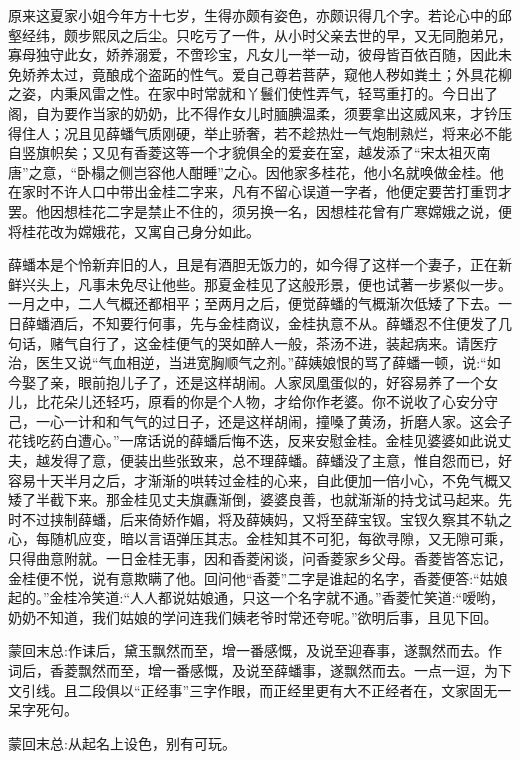 \begin{parag}
    原来这夏家小姐今年方十七岁，生得亦颇有姿色，亦颇识得几个字。若论心中的邱壑经纬，颇步熙凤之后尘。只吃亏了一件，从小时父亲去世的早，又无同胞弟兄，寡母独守此女，娇养溺爱，不啻珍宝，凡女儿一举一动，彼母皆百依百随，因此未免娇养太过，竟酿成个盗跖的性气。爱自己尊若菩萨，窥他人秽如粪土；外具花柳之姿，内秉风雷之性。在家中时常就和丫鬟们使性弄气，轻骂重打的。今日出了阁，自为要作当家的奶奶，比不得作女儿时腼腆温柔，须要拿出这威风来，才钤压得住人；况且见薛蟠气质刚硬，举止骄奢，若不趁热灶一气炮制熟烂，将来必不能自竖旗帜矣；又见有香菱这等一个才貌俱全的爱妾在室，越发添了“宋太祖灭南唐”之意，“卧榻之侧岂容他人酣睡”之心。因他家多桂花，他小名就唤做金桂。他在家时不许人口中带出金桂二字来，凡有不留心误道一字者，他便定要苦打重罚才罢。他因想桂花二字是禁止不住的，须另换一名，因想桂花曾有广寒嫦娥之说，便将桂花改为嫦娥花，又寓自己身分如此。
\end{parag}


\begin{parag}
    薛蟠本是个怜新弃旧的人，且是有酒胆无饭力的，如今得了这样一个妻子，正在新鲜兴头上，凡事未免尽让他些。那夏金桂见了这般形景，便也试著一步紧似一步。一月之中，二人气概还都相平；至两月之后，便觉薛蟠的气概渐次低矮了下去。一日薛蟠酒后，不知要行何事，先与金桂商议，金桂执意不从。薛蟠忍不住便发了几句话，赌气自行了，这金桂便气的哭如醉人一般，茶汤不进，装起病来。请医疗治，医生又说“气血相逆，当进宽胸顺气之剂。”薛姨娘恨的骂了薛蟠一顿，说:“如今娶了亲，眼前抱儿子了，还是这样胡闹。人家凤凰蛋似的，好容易养了一个女儿，比花朵儿还轻巧，原看的你是个人物，才给你作老婆。你不说收了心安分守己，一心一计和和气气的过日子，还是这样胡闹，撞嗓了黄汤，折磨人家。这会子花钱吃药白遭心。”一席话说的薛蟠后悔不迭，反来安慰金桂。金桂见婆婆如此说丈夫，越发得了意，便装出些张致来，总不理薛蟠。薛蟠没了主意，惟自怨而已，好容易十天半月之后，才渐渐的哄转过金桂的心来，自此便加一倍小心，不免气概又矮了半截下来。那金桂见丈夫旗纛渐倒，婆婆良善，也就渐渐的持戈试马起来。先时不过挟制薛蟠，后来倚娇作媚，将及薛姨妈，又将至薛宝钗。宝钗久察其不轨之心，每随机应变，暗以言语弹压其志。金桂知其不可犯，每欲寻隙，又无隙可乘，只得曲意附就。一日金桂无事，因和香菱闲谈，问香菱家乡父母。香菱皆答忘记，金桂便不悦，说有意欺瞒了他。回问他“香菱”二字是谁起的名字，香菱便答:“姑娘起的。”金桂冷笑道:“人人都说姑娘通，只这一个名字就不通。”香菱忙笑道:“嗳哟，奶奶不知道，我们姑娘的学问连我们姨老爷时常还夸呢。”欲明后事，且见下回。
\end{parag}


\begin{parag}
    \begin{note}蒙回末总:作诔后，黛玉飘然而至，增一番感慨，及说至迎春事，遂飘然而去。作词后，香菱飘然而至，增一番感慨，及说至薛蟠事，遂飘然而去。一点一逗，为下文引线。且二段俱以“正经事”三字作眼，而正经里更有大不正经者在，文家固无一呆字死句。\end{note}
\end{parag}


\begin{parag}
    \begin{note}蒙回末总:从起名上设色，别有可玩。\end{note}
\end{parag}

